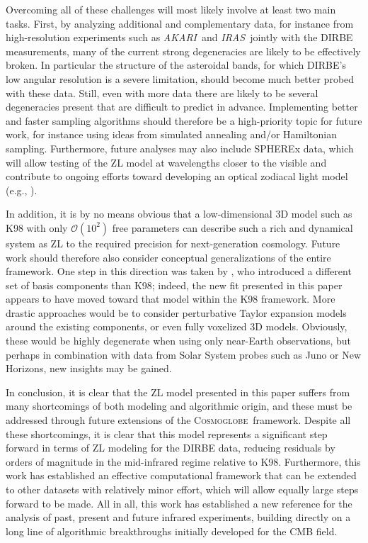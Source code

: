 \documentclass[twocolumn]{aa}
\def\IRAS{\textit{IRAS}}
\def\AKARI{\textit{AKARI}}
\newcommand{\cosmoglobe}{\textsc{Cosmoglobe}}
\begin{document}
Overcoming all of these challenges will most likely involve at least
two main tasks. First, by analyzing additional and complementary data,
for instance from high-resolution experiments such as \AKARI\ and \IRAS\, 
jointly with the DIRBE measurements, many of the current strong
degeneracies are likely to be effectively broken. In particular the
structure of the asteroidal bands, for which DIRBE's low angular
resolution is a severe limitation, should become much better probed
with these data. Still, even with more data there are likely to be
several degeneracies present that are difficult to predict in
advance. Implementing better and faster sampling algorithms should
therefore be a high-priority topic for future work, for instance using
ideas from simulated annealing and/or Hamiltonian sampling.
Furthermore, future analyses may also include SPHEREx data, 
which will allow testing of the ZL model at wavelengths closer to the 
visible and contribute to ongoing efforts toward developing an optical 
zodiacal light model (e.g., \citealt{skysurf}).

In addition, it is by no means obvious that a low-dimensional 3D model
such as K98 with only $\mathcal{O}(10^2)$ free parameters can describe
such a rich and dynamical system as ZL to the required precision for
next-generation cosmology. Future work should therefore also consider
conceptual generalizations of the entire framework. One step in this
direction was taken by \citet{Robinson2013}, who introduced a
different set of basis components than K98; indeed, the new fit
presented in this paper appears to have moved toward that model within
the K98 framework. More drastic approaches would be to consider
perturbative Taylor expansion models around the existing components,
or even fully voxelized 3D models. Obviously, these would be highly
degenerate when using only near-Earth observations, but perhaps
in combination with data from Solar System probes such as Juno or New
Horizons, new insights may be gained.

In conclusion, it is clear that the ZL model presented in this paper
suffers from many shortcomings of both modeling and algorithmic
origin, and these must be addressed through future extensions of
the \cosmoglobe\ framework. Despite all these
shortcomings, it is clear that this model represents a significant
step forward in terms of ZL modeling for the DIRBE data, reducing residuals
by orders of magnitude in the mid-infrared regime relative to K98. Furthermore, this
work has established an effective computational framework that can
be extended to other datasets with relatively minor effort, which 
will allow equally large steps forward to be made. All in all, this
work has established a new reference for the analysis of past, present
and future infrared experiments, building directly on a long line of
algorithmic breakthroughs initially developed for the CMB field.
\end{document}
